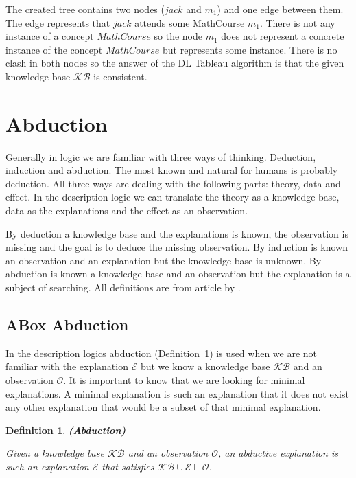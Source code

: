 \documentclass[12pt,a4paper]{article}
\newtheorem{definition}{Definition}[subsection]
\begin{document}
The created tree contains two nodes ($jack$ and $m_{1}$) and one edge between them. The edge represents that $jack$ attends some MathCourse $m_{1}$. There is not any instance of a concept $MathCourse$ so the node $m_{1}$ does not represent a concrete instance of the concept $MathCourse$ but represents some instance. There is no clash in both nodes so the answer of the DL Tableau algorithm is that the given knowledge base $\mathcal{KB}$ is consistent.

\pagebreak
\section{Abduction}
Generally in logic we are familiar with three ways of thinking. Deduction, induction and abduction. The most known and natural for humans is probably deduction. All three ways are dealing with the following parts: theory, data and effect. In the description logic we can translate the theory as a knowledge base, data as the explanations and the effect as an observation.

By deduction a knowledge base and the explanations is known, the observation is missing and the goal is to deduce the missing observation. By induction is known an observation and an explanation but the knowledge base is unknown. By abduction is known a knowledge base and an observation but the explanation is a subject of searching. All definitions are from article by \cite{pukancovaAboxAbduction}.

\subsection{ABox Abduction}
In the description logics abduction (Definition~\ref{def:abduction}) is used when we are not familiar with the explanation $\mathcal{E}$ but we know a knowledge base $\mathcal{KB}$ and an observation $\mathcal{O}$. It is important to know that we are looking for minimal explanations. A minimal explanation is such an explanation that it does not exist any other explanation that would be a subset of that minimal explanation.

\begin{definition}{\textbf{(Abduction)}} 
	\label{def:abduction}
		
	Given a knowledge base $\mathcal{KB}$ and an observation $\mathcal{O}$, an abductive explanation is such an explanation $\mathcal{E}$ that satisfies $\mathcal{KB} \cup \mathcal{E} \models \mathcal{O}$.
\end{definition}
\end{document}
